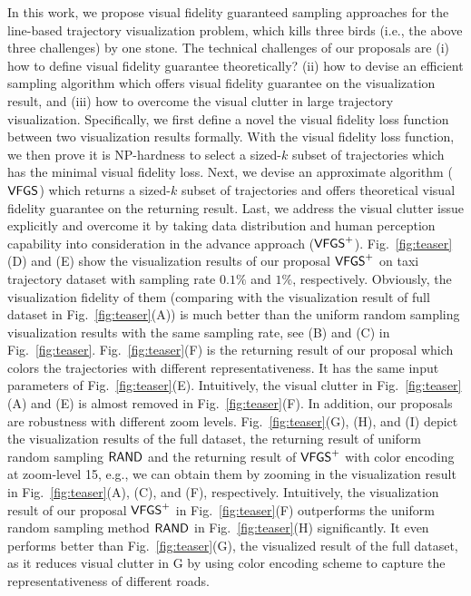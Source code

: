 In this work, we propose visual fidelity guaranteed sampling approaches for the line-based trajectory visualization problem,
which kills three birds (i.e., the above three challenges) by one stone.
The technical challenges of our proposals are
(i) how to define visual fidelity guarantee theoretically?
(ii) how to devise an efficient sampling algorithm which offers visual fidelity guarantee on the visualization result,
and (iii) how to overcome the visual clutter in large trajectory visualization.
Specifically, we first define a novel the visual fidelity loss function between two visualization results formally.
With the visual fidelity loss function, we then prove it is NP-hardness to select a sized-$k$ subset of trajectories which has the minimal visual fidelity loss.
Next, we devise an approximate algorithm ($\mathsf{VFGS}$) which returns a sized-$k$ subset of trajectories and offers theoretical visual fidelity guarantee on the returning result.
Last, we address the visual clutter issue explicitly and overcome it by taking data distribution and human perception capability into consideration in the advance approach ($\mathsf{VFGS}^{+}$).
Fig.~\ref{fig:teaser}(D) and (E) show the visualization results of our proposal $\mathsf{VFGS}^{+}{}$ on \pt{} taxi trajectory dataset with sampling rate $0.1\%$ and $1\%$, respectively.
Obviously, the visualization fidelity of them (comparing with the visualization result of full dataset in Fig.~\ref{fig:teaser}(A)) is much better than
the uniform random sampling visualization results with the same sampling rate, see (B) and (C) in Fig.~\ref{fig:teaser}.
Fig.~\ref{fig:teaser}(F) is the returning result of our proposal which colors the trajectories with different representativeness.
It has the same input parameters of Fig.~\ref{fig:teaser}(E).
Intuitively, the visual clutter in Fig.~\ref{fig:teaser}(A) and (E) is almost removed in Fig.~\ref{fig:teaser}(F).
In addition, our proposals are robustness with different zoom levels.
Fig.~\ref{fig:teaser}(G), (H), and (I) depict the visualization results of the full \pt{} dataset, the returning result of uniform random sampling $\mathsf{RAND}$ and the returning result of $\mathsf{VFGS}^{+}$ with color encoding at zoom-level 15, e.g., we can obtain them by zooming in the visualization result in Fig.~\ref{fig:teaser}(A), (C), and (F), respectively.
Intuitively, the visualization result of our proposal $\mathsf{VFGS}^{+}$ in Fig.~\ref{fig:teaser}(F) outperforms the uniform random sampling method $\mathsf{RAND}$ in Fig.~\ref{fig:teaser}(H) significantly.
It even performs better than Fig.~\ref{fig:teaser}(G), the visualized result of the full dataset, as it reduces visual clutter in G by using color encoding scheme to capture the representativeness of different roads.

